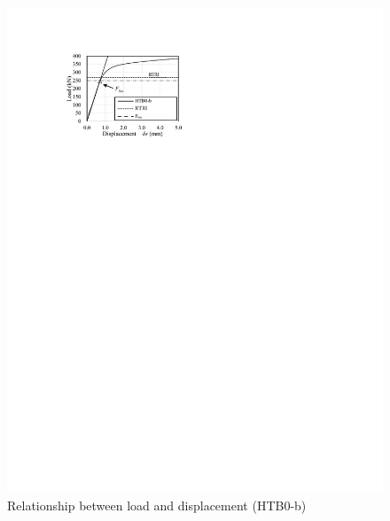 \begin{figure}[htbp]
\begin{minipage}[t]{0.48\textwidth}
    \includegraphics{imgs/ch4/ld-htb0b.pdf}
    \caption{Relationship between load and displacement (HTB0-b)}
    \label{fig-ld-htb0b}
    \end{minipage}
    \begin{minipage}[t]{0.48\textwidth}

\end{minipage}
\end{figure}

